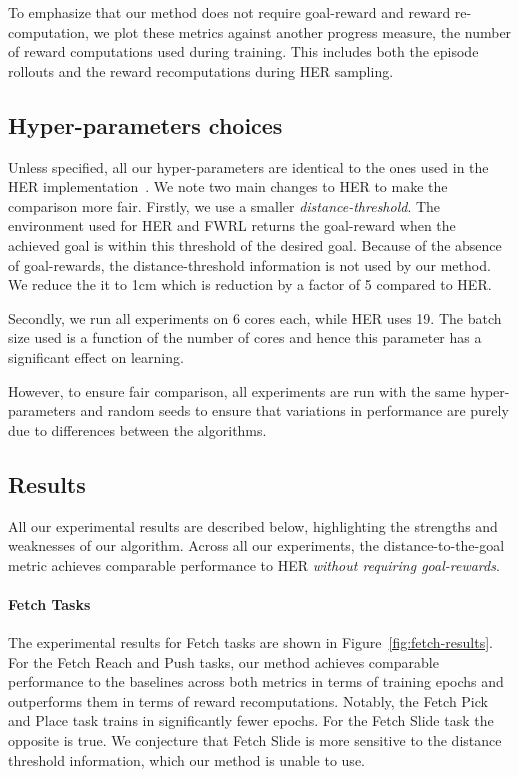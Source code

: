 To emphasize that our method does not require goal-reward
and reward re-computation, we plot these metrics against another
progress measure, the number of reward computations used during
training. This includes both the episode rollouts and the reward recomputations
during HER sampling.

%


\subsection{Hyper-parameters choices} \label{sec:hyperparams}
Unless specified, all our hyper-parameters are identical to the ones
used in the HER
implementation~\citep{dhariwal2017baselines}. We note two main changes
to HER to make the comparison more fair. Firstly,
we use a smaller \emph{distance-threshold}.
The environment used for HER and FWRL returns the goal-reward when the
achieved goal is within this threshold of the desired goal. Because of
the absence of goal-rewards, the distance-threshold information is not used by our
method.
We reduce the it to 1cm which is reduction by a factor of 5 compared to
HER.

Secondly, we run all experiments on 6 cores each,
while HER uses 19. The batch size used is a function of the number of
cores and hence this parameter has a significant effect on learning. 

However, to ensure fair comparison, all experiments are run with the same hyper-parameters and
random seeds to ensure that variations in performance are purely due
to differences between the algorithms.

\subsection{Results}
All our experimental results are described below, highlighting the strengths and
weaknesses of our algorithm. Across all our experiments, the
distance-to-the-goal metric achieves comparable performance to HER
\emph{without requiring goal-rewards}. 

\paragraph{Fetch Tasks}

The experimental results for Fetch tasks are shown in
Figure~\ref{fig:fetch-results}. For the Fetch Reach and Push tasks, our
method achieves comparable performance to the baselines 
across both metrics in terms of training epochs and outperforms them in
terms of reward recomputations. Notably, the Fetch
Pick and Place task trains in significantly fewer epochs. For the Fetch
Slide task the opposite is true.
We conjecture that Fetch Slide is more sensitive to the
distance threshold information, which our method is unable to use.


